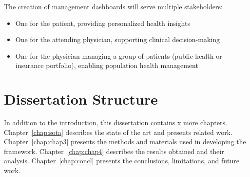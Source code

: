 The creation of management dashboards will serve multiple stakeholders:
\begin{itemize}
\item One for the patient, providing personalized health insights
\item One for the attending physician, supporting clinical decision-making
\item One for the physician managing a group of patients (public health or insurance portfolio), enabling population health management
\end{itemize}

\section{Dissertation Structure} \label{sec:struct}

In addition to the introduction, this dissertation contains x more chapters.
Chapter~\ref{chap:sota} describes the state of the art and presents related work.
Chapter~\ref{chap:chap3} presents the methods and materials used in developing the framework.
Chapter~\ref{chap:chap4} describes the results obtained and their analysis.
Chapter~\ref{chap:concl} presents the conclusions, limitations, and future work.
